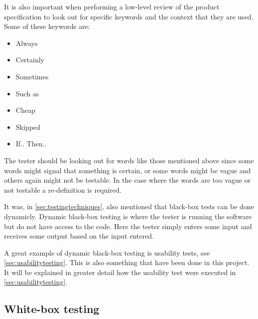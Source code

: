It is also important when performing a low-level review of the product specification to look out for specific keywords and the context that they are used.
Some of these keywords are:
\begin{multicols}{2}
\begin{itemize}
	\item Always
	\item Certainly
	\item Sometimes
	\item Such as
	\item Cheap
	\item Skipped
	\item If.. Then..
\end{itemize}
\end{multicols}

The tester should be looking out for words like those mentioned above since some words might signal that something is certain, or some words might be vague and others again might not be testable.
In the case where the words are too vague or not testable a re-definition is required. \cite{SoftwareTesting}






It was, in \cref{sec:testingtechniques}, also mentioned that black-box tests can be done dynamicly.
Dynamic black-box testing is where the tester is running the software but do not have access to the code. %
Here the tester simply enters some input and receives some output based on the input entered. \cite{SoftwareTesting}

A great example of dynamic black-box testing is usability tests, see \cref{sec:usabilitytesting}.
This is also something that have been done in this project.
It will be explained in greater detail how the usability test were executed in \cref{sec:usabilitytesting}.

\subsection{White-box testing} \label{sec:whiteboxtesting}
